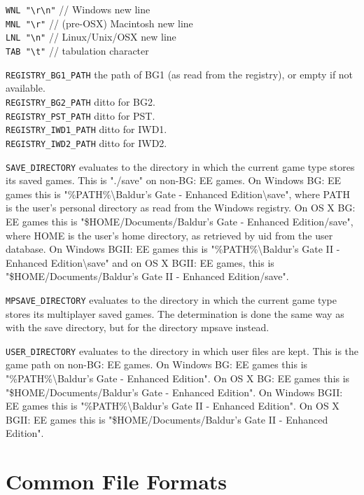 \documentclass{article}
\def\t#1{{\tt #1}}
\begin{document}
\verb+WNL "\r\n"+ // Windows new line\\
\verb+MNL "\r"+ // (pre-OSX) Macintosh new line\\
\verb+LNL "\n"+ // Linux/Unix/OSX new line\\
\verb+TAB "\t"+ // tabulation character

\verb+REGISTRY_BG1_PATH+ the path of BG1 (as read from the registry), or empty if not available.\\
\verb+REGISTRY_BG2_PATH+ ditto for BG2.\\
\verb+REGISTRY_PST_PATH+ ditto for PST.\\
\verb+REGISTRY_IWD1_PATH+ ditto for IWD1.\\
\verb+REGISTRY_IWD2_PATH+ ditto for IWD2.

\verb+SAVE_DIRECTORY+ evaluates to the directory in which the current game type stores its saved games. This is "./save" on non-BG: EE games. On Windows BG: EE games this is "\%PATH\%\backslash Baldur's Gate - Enhanced Edition\backslash save", where PATH is the user's personal directory as read from the Windows registry. On OS X BG: EE games this is "\$HOME/Documents/Baldur's Gate - Enhanced Edition/save", where HOME is the user's home directory, as retrieved by uid from the user database. On Windows BGII: EE games this is "\%PATH\%\backslash Baldur's Gate II - Enhanced Edition\backslash save" and on OS X BGII: EE games, this is "\$HOME/Documents/Baldur's Gate II - Enhanced Edition/save".

\verb+MPSAVE_DIRECTORY+ evaluates to the directory in which the current game type stores its multiplayer saved games. The determination is done the same way as with the save directory, but for the directory mpsave instead.

\verb+USER_DIRECTORY+ evaluates to the directory in which user files are kept. This is the game path on non-BG: EE games. On Windows BG: EE games this is "\%PATH\%\backslash Baldur's Gate - Enhanced Edition". On OS X BG: EE games this is "\$HOME/Documents/Baldur's Gate - Enhanced Edition". On Windows BGII: EE games this is "\%PATH\%\backslash Baldur's Gate II - Enhanced Edition". On OS X BGII: EE games this is "\$HOME/Documents/Baldur's Gate II - Enhanced Edition".

\section{Common File Formats}
\end{document}
